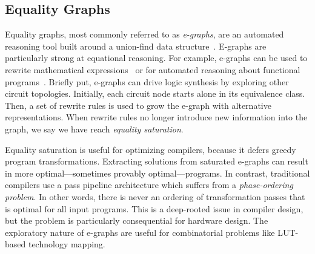\subsection{Equality Graphs}\label{sec:background:egraph}
Equality graphs, most commonly referred to as \textit{e-graphs}, are an
automated reasoning tool built around a union-find data
structure~\cite{eggpaper, eqsat}. E-graphs are particularly strong at
equational reasoning. For example, e-graphs can be used to rewrite mathematical
expressions~\cite{egraphmath} or for automated reasoning about functional
programs~\cite{cclemma}. Briefly put, e-graphs can drive logic synthesis by
exploring other circuit topologies. Initially, each circuit node starts alone
in its equivalence class. Then, a set of rewrite rules is used to grow the
e-graph with alternative representations. When rewrite rules no longer
introduce new information into the graph, we say we have reach \textit{equality
    saturation}.

Equality saturation is useful for optimizing compilers, because it defers
greedy program transformations. Extracting solutions from saturated e-graphs
can result in more optimal---sometimes provably optimal---programs. In
contrast, traditional compilers use a pass pipeline architecture which suffers
from a \textit{phase-ordering problem}. In other words, there is never an
ordering of transformation passes that is optimal for all input programs. This
is a deep-rooted issue in compiler design, but the problem is particularly
consequential for hardware design. The exploratory nature of e-graphs are
useful for combinatorial problems like LUT-based technology mapping.
